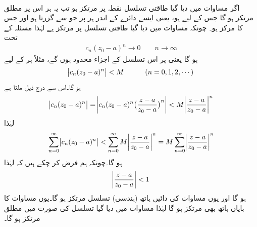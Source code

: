 \quad {}\\
اگر مساوات  میں دیا گیا طاقتی تسلسل نقطہ  پر مرتکز ہو تب یہ ہر اس  پر مطلق مرتکز ہو گا جس کے لیے
  ہو، یعنی ایسے دائرے کے اندر ہر  پر جو  سے گزرتا ہو اور جس کا مرکز  ہو۔
چونکہ مساوات  میں دیا گیا طاقتی تسلسل  پر مرتکز ہے لہٰذا مسئلہ  کے تحت
\begin{align*}
c_n(z_0-a)^n\to 0 \quad \quad n\to \infty
\end{align*}
ہو گا یعنی  پر اس تسلسل کے اجزاء محدود ہوں گے، مثلاً ہر  کے لیے
\begin{align*}
\abs{c_n(z_0-a)^n}<M\quad \quad \quad (n=0,1,2,\cdots)
\end{align*}
ہو گا۔اس سے  درج ذیل ملتا ہے
\begin{align*}
\abs{c_n(z_0-a)^n}=\abs{c_n(z_0-a)^n\big(\frac{z-a}{z_0-a}\big)^n}<M\abs{\frac{z-a}{z_0-a}}^n
\end{align*}
لہٰذا 
\begin{align}\label{مساوات_ٹیلر_ثبوت_طاقتی_تسلسل_مرکوزیت}
\sum\limits_{n=0}^{\infty}\abs{c_n(z_0-a)^n}<\sum\limits_{n=0}^{\infty}M\abs{\frac{z-a}{z_0-a}}^n=M\sum\limits_{n=0}^{\infty}\abs{\frac{z-a}{z_0-a}}^n
\end{align}
ہو گا۔چونکہ ہم فرض کر چکے ہیں کہ  لہٰذا
\begin{align*}
\abs{\frac{z-a}{z_0-a}}<1
\end{align*}
ہو گا اور یوں  مساوات  کی دائیں ہاتھ  (ہندسی) تسلسل مرتکز ہو گا۔یوں  مساوات  کا بایاں ہاتھ بھی مرتکز ہو گا لہٰذا مساوات  میں دیا گیا تسلسل  کی صورت میں مطلق مرتکز ہو گا۔

